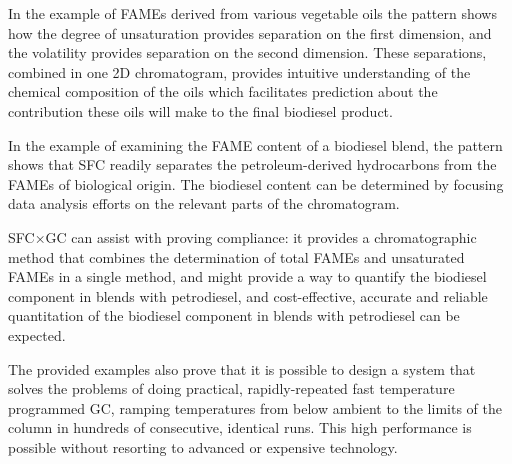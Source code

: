 In the example of FAMEs derived from various vegetable oils the pattern shows
how the degree of unsaturation provides separation on the first dimension, and
the volatility provides separation on the second dimension. These separations,
combined in one 2D chromatogram, provides intuitive understanding of the
chemical composition of the oils which facilitates prediction about the
contribution these oils will make to the final biodiesel product.

In the example of examining the FAME content of a biodiesel blend, the pattern
shows that SFC readily separates the petroleum-derived hydrocarbons from the
FAMEs of biological origin. The biodiesel content can be determined by focusing
data analysis efforts on the relevant parts of the chromatogram.

SFC×GC can assist with proving compliance: it provides a chromatographic method that
combines the determination of total FAMEs and unsaturated FAMEs in a single
method, and might provide a way to quantify the biodiesel component in blends
with petrodiesel, and cost-effective, accurate and reliable quantitation of the
biodiesel component in blends with petrodiesel can be expected.

The provided examples also prove that it is possible to design a system that
solves the problems of doing practical, rapidly-repeated fast temperature
programmed GC, ramping temperatures from below ambient to the limits of the
column in hundreds of consecutive, identical runs. This high performance is
possible without resorting to advanced or expensive technology.
